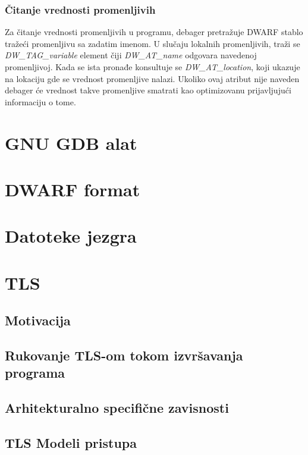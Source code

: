 \documentclass[12pt,oneside]{memoir}
\begin{document}
\subsection{Čitanje vrednosti promenljivih}

Za čitanje vrednosti promenljivih u programu, debager pretražuje DWARF stablo tražeći promenljivu sa zadatim imenom. U slučaju lokalnih promenljivih, traži se \emph{DW\_TAG\_variable} element čiji \emph{DW\_AT\_name} odgovara navedenoj promenljivoj. Kada se ista pronađe konsultuje se \emph{DW\_AT\_location}, koji ukazuje na lokaciju gde se vrednost promenljive nalazi. Ukoliko ovaj atribut nije naveden debager će vrednost takve promenljive smatrati kao optimizovanu prijavljujući informaciju o tome.

\chapter{GNU GDB alat}
\label{chp:GDB}

\chapter{DWARF format}
\label{chp:DWARF}

\chapter{Datoteke jezgra}
\label{chp:corefiles}

\chapter{TLS}
\label{chp:TLS}


\section{Motivacija}
\section{Rukovanje TLS-om tokom izvršavanja programa}
\section{Arhitekturalno specifične zavisnosti}
\section{TLS Modeli pristupa}
\end{document}
